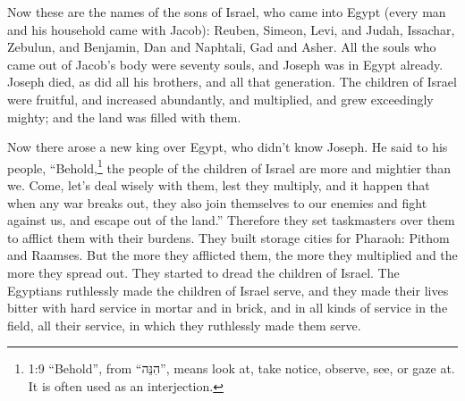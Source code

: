 \newpage
\null
\thispagestyle{empty}
\newpage








\vspace{-1.36in}

\mychapter{}
\myverse*{}Now these are the names of the sons of Israel, who came into Egypt
(every man and his household came with Jacob): \myverse{}Reuben, Simeon, Levi, and Judah, \myverse{}Issachar, Zebulun, and Benjamin, \myverse{}Dan and Naphtali, Gad and Asher. \myverse{}All the souls who came out of Jacob’s body were seventy souls, and Joseph was in Egypt already. \myverse{}Joseph died, as did all his brothers, and all that generation. \myverse{}The children of Israel were fruitful, and increased abundantly, and multiplied, and grew exceedingly mighty; and the land was filled with them.

\myverse{}Now there arose a new king over Egypt, who didn’t know Joseph.
\myverse{}He said to his people, “Behold,\footnote{1:9 “Behold”, from “הִנֵּה”, means look at, take notice, observe, see, or gaze at. It is
	often used as an interjection.} the people of the children of Israel are more and mightier than
we.
\myverse{}Come, let’s deal wisely with them, lest they multiply, and it happen that
when any war breaks out, they also join themselves to our enemies and fight against us, and escape out
of the land.”
\myverse{}Therefore they set taskmasters over them to afflict them with their burdens.
They built storage cities for Pharaoh: Pithom and Raamses.
\myverse{}But the more they afflicted them, the more they multiplied and the more they
spread out. They started to dread the children of Israel.
\myverse{}The Egyptians ruthlessly made the children of Israel serve,
\myverse{}and they made their lives bitter with hard service in mortar and in brick,
and in all kinds of service in the field, all their service, in which they ruthlessly made them serve.


